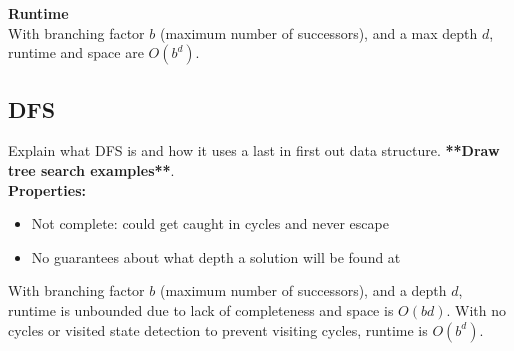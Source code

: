 \documentclass[letterpaper]{article} %
\begin{document}
\textbf{Runtime}\\

With branching factor $b$ (maximum number of successors), and a max depth $d$, runtime and space are $O(b^d)$.

\subsection{DFS}

Explain what DFS is and how it uses a last in first out data structure. \textbf{**Draw tree search examples**}.\\

\textbf{Properties:}

\begin{itemize}
	\item Not complete: could get caught in cycles and never escape
	\item No guarantees about what depth a solution will be found at
\end{itemize}

With branching factor $b$ (maximum number of successors), and a depth $d$, runtime is unbounded due to lack of completeness and space is $O(bd)$. With no cycles or visited state detection to prevent visiting cycles, runtime is $O(b^d)$.
\end{document}

